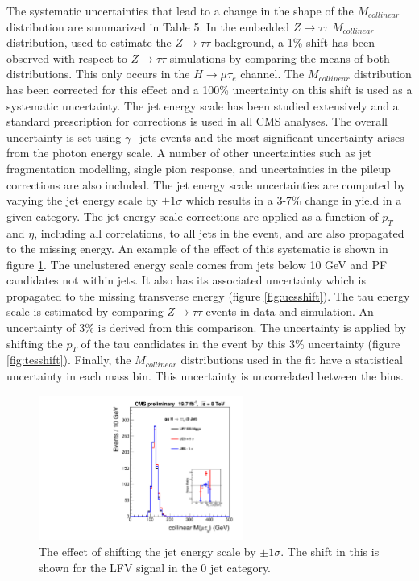 \documentclass[oneside, letterpaper, oldfontcommands]{memoir}
\begin{document}
\qquad The systematic uncertainties that lead to a change in the shape of the $M_{collinear}$ distribution are summarized in Table 5. In the embedded $Z \rightarrow \tau\tau$ $M_{collinear}$ distribution, used to estimate the $Z \rightarrow \tau\tau$ background, a 1\% shift has been observed with respect to $Z \rightarrow \tau\tau$ simulations by comparing the means of both distributions. This only occurs in the $H \rightarrow \mu\tau_{e}$ channel. The $M_{collinear}$ distribution has been corrected for this effect and a 100\% uncertainty on this shift is used as a systematic uncertainty. The jet energy scale has been studied extensively and a standard prescription for corrections\cite{Chatrchyan:2011ds} is used in all CMS analyses. The overall uncertainty is set using $\gamma$+jets events and the most significant uncertainty arises from the photon energy scale. A number of other uncertainties such as jet fragmentation modelling, single pion response, and uncertainties in the pileup corrections are also included. The jet energy scale uncertainties are computed by varying the jet energy scale by $\pm 1 \sigma$ which results in a 3-7\% change in yield in a given category. The jet energy scale corrections are applied as a function of $p_{T}$ and $\eta$, including all correlations, to all jets in the event, and are also propagated to the missing energy. An example of the effect of this systematic is shown in figure \ref{fig:jesshift}. The unclustered energy scale comes from jets below 10 GeV and PF candidates not within jets. It also has its associated uncertainty which is propagated to the missing transverse energy (figure \ref{fig:uesshift}). The tau energy scale is estimated by comparing $Z \rightarrow \tau\tau$ events in data and simulation. An uncertainty of 3\% is derived from this comparison\cite{CMS-PAS-HIG-12-018}. The uncertainty is applied by shifting the $p_{T}$ of the tau candidates in the event by this 3\% uncertainty (figure \ref{fig:tesshift}). Finally, the $M_{collinear}$ distributions used in the fit have a statistical uncertainty in each mass bin. This uncertainty is uncorrelated between the bins.

\begin{figure}[hbtp]\centering
\includegraphics[width=0.6\textwidth]{JES_Shift_8TeV.pdf}

\caption{The effect of shifting the jet energy scale by $\pm 1 \sigma$. The shift in this is shown for the LFV signal in the 0 jet category.} 
\label{fig:jesshift}\end{figure}
\end{document}

